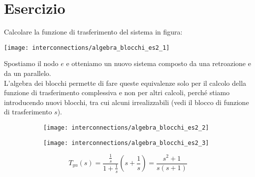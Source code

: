 \documentclass[../main.tex]{subfiles}
\begin{document}
	\section{Esercizio}
	Calcolare la funzione di trasferimento del sistema in figura:
	\begin{center}
		\texttt{[image: interconnections/algebra\_blocchi\_es2\_1]}
	\end{center}
	Spostiamo il nodo $ e $ e otteniamo un nuovo sistema composto da una retroazione e da un parallelo.\\
	L'algebra dei blocchi permette di fare queste equivalenze solo per il calcolo della funzione di trasferimento complessiva e non per altri calcoli, perch\'e stiamo introducendo nuovi blocchi, tra cui alcuni irrealizzabili (vedi il blocco di funzione di trasferimento $ s $).
	\begin{figure}[h!]
		\centering
		\begin{subfigure}{0.5\textwidth}
			\texttt{[image: interconnections/algebra\_blocchi\_es2\_2]}
		\end{subfigure}%
		\begin{subfigure}{0.5\textwidth}
			\texttt{[image: interconnections/algebra\_blocchi\_es2\_3]}
		\end{subfigure}%
	\end{figure}
	\[ T_{yu}(s) = \frac{\frac{1}{s}}{1+\frac{1}{s}} \left( s+\frac{1}{s} \right) = \frac{s^2+1}{s(s+1)} \]
\end{document}
